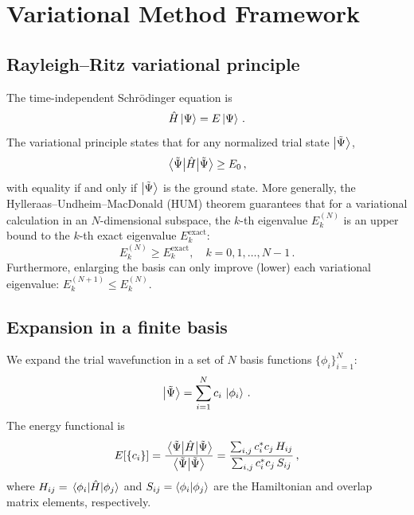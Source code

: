 \section{Variational Method Framework}\label{sec:variational}

\subsection{Rayleigh--Ritz variational principle}

The time-independent Schr\"odinger equation is
\begin{equation}\label{eq:TISE}
  \hat{H}\ket{\Psi} = E\ket{\Psi}\,.
\end{equation}
The variational principle states that for any normalized trial state $\ket{\tilde{\Psi}}$,
\begin{equation}\label{eq:variational_bound}
  \mel{\tilde{\Psi}}{\hat{H}}{\tilde{\Psi}} \geq E_0\,,
\end{equation}
with equality if and only if $\ket{\tilde{\Psi}}$ is the ground state.
More generally, the Hylleraas--Undheim--MacDonald (HUM) theorem guarantees that
for a variational calculation in an $N$-dimensional subspace, the $k$-th eigenvalue
$E_k^{(N)}$ is an upper bound to the $k$-th exact eigenvalue $E_k^{\text{exact}}$:
\begin{equation}
  E_k^{(N)} \geq E_k^{\text{exact}},\quad k = 0, 1, \ldots, N-1\,.
\end{equation}
Furthermore, enlarging the basis can only improve (lower) each variational eigenvalue:
$E_k^{(N+1)} \leq E_k^{(N)}$.

\subsection{Expansion in a finite basis}

We expand the trial wavefunction in a set of $N$ basis functions $\{\phi_i\}_{i=1}^{N}$:
\begin{equation}\label{eq:expansion}
  \ket{\tilde{\Psi}} = \sum_{i=1}^{N} c_i\,\ket{\phi_i}\,.
\end{equation}
The energy functional is
\begin{equation}
  E[\{c_i\}] = \frac{\mel{\tilde{\Psi}}{\hat{H}}{\tilde{\Psi}}}{\braket{\tilde{\Psi}}}
  = \frac{\sum_{i,j} c_i^* c_j\,H_{ij}}{\sum_{i,j} c_i^* c_j\,S_{ij}}\,,
\end{equation}
where $H_{ij} = \mel{\phi_i}{\hat{H}}{\phi_j}$ and $S_{ij} = \braket{\phi_i}{\phi_j}$
are the Hamiltonian and overlap matrix elements, respectively.

